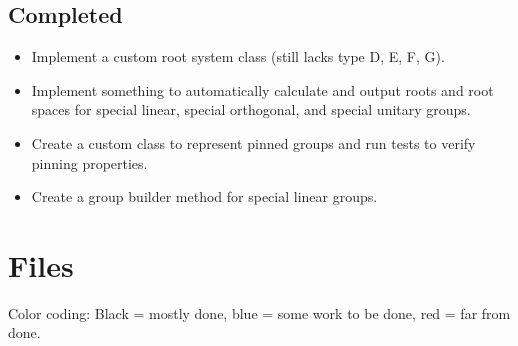 \documentclass[12pt]{article}
\begin{document}
\subsection{Completed}
\begin{itemize}
	\item Implement a custom root system class (still lacks type D, E, F, G).
	\item Implement something to automatically calculate and output roots and root spaces for special linear, special orthogonal, and special unitary groups.
	\item Create a custom class to represent pinned groups and run tests to verify pinning properties.
	\item Create a group builder method for special linear groups.
\end{itemize}

\newpage

\section{Files}

Color coding: Black = mostly done, {\color{blue} blue = some work to be done}, {\color{red} red = far from done.}
\end{document}
